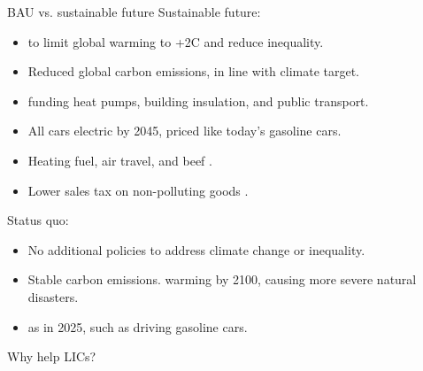 \documentclass[aspectratio=169,xcolor=dvipsnames, 11pt,mathserif]{beamer}
\begin{document}
\begin{frame}{BAU vs. sustainable future}
Sustainable future:
\begin{itemize}
    \item {} to limit global warming to +2\textdegree{}C and reduce inequality.
    \item Reduced global carbon emissions, in line with climate target.
    \item {} funding heat pumps, building insulation, and public transport.
    \item All cars electric by 2045, priced like today's gasoline cars.
    \item Heating fuel, air travel, and beef . 
    \item Lower sales tax on non-polluting goods .
\end{itemize}
Status quo:
\begin{itemize}
    \item No additional policies to address climate change or inequality. 
    \item Stable carbon emissions.  warming by 2100, causing more severe natural disasters.
    \item {} as in 2025, such as driving gasoline cars.
\end{itemize}
\end{frame}

\begin{frame}{Why help LICs?}
\end{frame}
\end{document}
